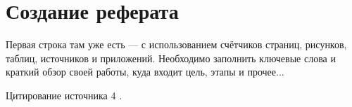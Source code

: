 \section{Создание реферата}

Первая строка там уже есть --- с использованием счётчиков страниц, рисунков, 
таблиц, источников и приложений. 
Необходимо заполнить ключевые слова и краткий обзор своей работы, 
куда входит цель, этапы и прочее...

\lipsum[3-4]

Цитирование источника 4 \cite{Wikipedia4} \cite{cite_1_2} \cite{cite_1_15} \cite{cite_1_16}.
